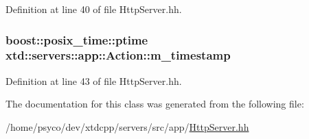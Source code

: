 Definition at line 40 of file Http\+Server.\+hh.

\subsubsection[{\texorpdfstring{m\+\_\+timestamp}{m_timestamp}}]{\setlength{\rightskip}{0pt plus 5cm}boost\+::posix\+\_\+time\+::ptime xtd\+::servers\+::app\+::\+Action\+::m\+\_\+timestamp}\hypertarget{classxtd_1_1servers_1_1app_1_1Action_a3baf29675a2f46cf5946816cf6c9b7b6}{}\label{classxtd_1_1servers_1_1app_1_1Action_a3baf29675a2f46cf5946816cf6c9b7b6}


Definition at line 43 of file Http\+Server.\+hh.



The documentation for this class was generated from the following file\+:\begin{DoxyCompactItemize}
\item 
/home/psyco/dev/xtdcpp/servers/src/app/\hyperlink{HttpServer_8hh}{Http\+Server.\+hh}\end{DoxyCompactItemize}
